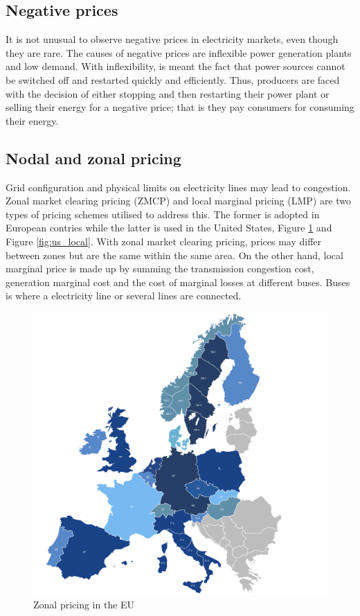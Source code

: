\subsection{Negative prices}
It is not unusual to observe negative prices in electricity markets, even though they are rare.
The causes of negative prices are inflexible power generation plants and low demand. With inflexibility, is meant the fact that power sources cannot be switched off and restarted quickly and efficiently.
Thus, producers are faced with the decision of either stopping and then restarting their power plant or selling their energy for a negative price; that is they pay consumers for consuming their energy.

\subsection{Nodal and zonal pricing}
Grid configuration and physical limits on electricity lines may lead to congestion. Zonal market clearing pricing (ZMCP) and local marginal pricing (LMP) are two types of pricing schemes utilised to address this. The former is adopted in European contries while the latter is used in the United States, Figure \ref{fig:eu_zonal} and Figure \ref{fig:us_local}.
With zonal market clearing pricing, prices may differ between zones but are the same within the same area.
On the other hand, local marginal price is made up by summing the transmission congestion cost, generation marginal cost and the cost of marginal losses at different buses. Buses is where a electricity line or several lines are connected.
\begin{figure}[!ht]
    \includegraphics[width=\textwidth]{images/eu_zonal.png}
    \caption[Zonal pricing in the EU]{Zonal pricing in the EU }
    \label{fig:eu_zonal}
\end{figure}

